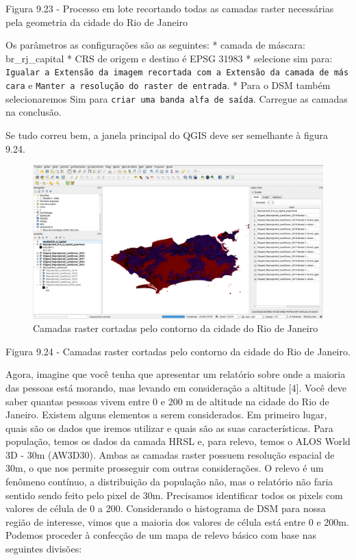 \documentclass[
]{krantz}
\begin{document}
Figura 9.23 - Processo em lote recortando todas as camadas raster necessárias pela geometria da cidade do Rio de Janeiro

Os parâmetros as configurações são as seguintes:
* camada de máscara: br\_rj\_capital
* CRS de origem e destino é EPSG 31983
* selecione sim para: \texttt{Igualar\ a\ Extensão\ da\ imagem\ recortada\ com\ a\ Extensão\ da\ camada\ de\ máscara} e \texttt{Manter\ a\ resolução\ do\ raster\ de\ entrada}.
* Para o DSM também selecionaremos Sim para \texttt{criar\ uma\ banda\ alfa\ de\ saída}. Carregue as camadas na conclusão.

Se tudo correu bem, a janela principal do QGIS deve ser semelhante à figura 9.24.

\begin{figure}
\centering
\includegraphics{media/modulo9/fig924.png}
\caption{Camadas raster cortadas pelo contorno da cidade do Rio de Janeiro}
\end{figure}

Figura 9.24 - Camadas raster cortadas pelo contorno da cidade do Rio de Janeiro.

Agora, imagine que você tenha que apresentar um relatório sobre onde a maioria das pessoas está morando, mas levando em consideração a altitude {[}4{]}. Você deve saber quantas pessoas vivem entre 0 e 200 m de altitude na cidade do Rio de Janeiro. Existem alguns elementos a serem considerados. Em primeiro lugar, quais são os dados que iremos utilizar e quais são as suas características. Para população, temos os dados da camada HRSL e, para relevo, temos o ALOS World 3D - 30m (AW3D30). Ambas as camadas raster possuem resolução espacial de 30m, o que nos permite prosseguir com outras considerações. O relevo é um fenômeno contínuo, a distribuição da população não, mas o relatório não faria sentido sendo feito pelo pixel de 30m. Precisamos identificar todos os pixels com valores de célula de 0 a 200. Considerando o histograma de DSM para nossa região de interesse, vimos que a maioria dos valores de célula está entre 0 e 200m. Podemos proceder à confecção de um mapa de relevo básico com base nas seguintes divisões:
\end{document}
